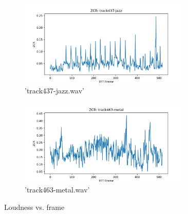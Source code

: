 \documentclass[11pt,a4paper]{article}
\begin{document}
\begin{figure}[tb]\ContinuedFloat
	\begin{subfigure}[t]{\hsize}
		\centering
		\includegraphics[width=0.9\textwidth]{zcr_track437-jazz}
		\caption{'track437-jazz.wav'}
		\label{fig:zcr_jazz}
	\end{subfigure}
	\begin{subfigure}[t]{\hsize}
		\centering
		\includegraphics[width=0.9\textwidth]{zcr_track463-metal}
		\caption{'track463-metal.wav'}
		\label{fig:zcr_metal}
	\end{subfigure}
	\caption{Loudness vs. frame}
\end{figure}
\clearpage
\end{document}
